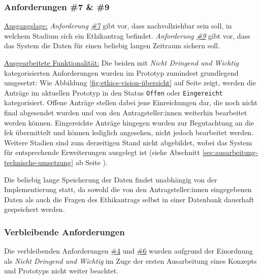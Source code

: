 \documentclass[a4paper,12pt,twoside,numbers=noendperiod]{scrreprt}
\begin{document}
\subsubsection*{Anforderungen \#7 \& \#9}
\label{sub-sub-sec:umgesetzte-funktionalitäten-anforderung-7-9}

\noindent\underline{Ausgangslage:} \textit{Anforderung \hyperref[sub-sub-sec:abgeleitete-anforderungen-nach-einreichung]{\#7}} gibt vor, dass nachvollziehbar sein soll, in welchem Stadium sich ein Ethikantrag befindet. \textit{Anforderung \hyperref[sub-sub-sec:abgeleitete-anforderungen-nach-einreichung]{\#9}} gibt vor, dass das System die Daten für einen beliebig langen Zeitraum sichern soll.

\medskip

\noindent\underline{Ausgearbeitete Funktionalität:} Die beiden mit \textit{Nicht Dringend und Wichtig} kategorisierten Anforderungen wurden im Prototyp zumindest grundlegend umgesetzt: Wie Abbildung \ref{fig:ethics-vision-übersicht} auf Seite \pageref{fig:ethics-vision-übersicht} zeigt, werden die Anträge im aktuellen Prototyp in den Status \texttt{Offen} oder \texttt{Eingereicht} kategorisiert. Offene Anträge stellen dabei jene Einreichungen dar, die noch nicht final abgesendet wurden und von den Antragsteller:innen weiterhin bearbeitet werden können. Eingereichte Anträge hingegen wurden zur Begutachtung an die \ac{fek} übermittelt und können lediglich angesehen, nicht jedoch bearbeitet werden. Weitere Stadien sind zum derzeitigen Stand nicht abgebildet, wobei das System für entsprechende Erweiterungen ausgelegt ist (siehe Abschnitt \ref{sec:ausarbeitung-technische-umsetzung} ab Seite \pageref{sec:ausarbeitung-technische-umsetzung}).

Die beliebig lange Speicherung der Daten findet unabhängig von der Implementierung statt, da sowohl die von den Antragsteller:innen eingegebenen Daten als auch die Fragen des Ethikantrags selbst in einer Datenbank dauerhaft gespeichert werden.

\subsubsection*{Verbleibende Anforderungen}
\label{sub-sub-sec:umgesetzte-funktionalitäten-verbleibende-anforderungen}

Die verbleibenden Anforderungen \hyperref[sub-sub-sec:abgeleitete-anforderungen-während-erstellung-einreichung]{\#4} und \hyperref[sub-sub-sec:abgeleitete-anforderungen-während-erstellung-einreichung]{\#6} wurden aufgrund der Einordnung als \textit{Nicht Dringend und Wichtig} im Zuge der ersten Ausarbeitung eines Konzepts und Prototyps nicht weiter beachtet.
\end{document}
